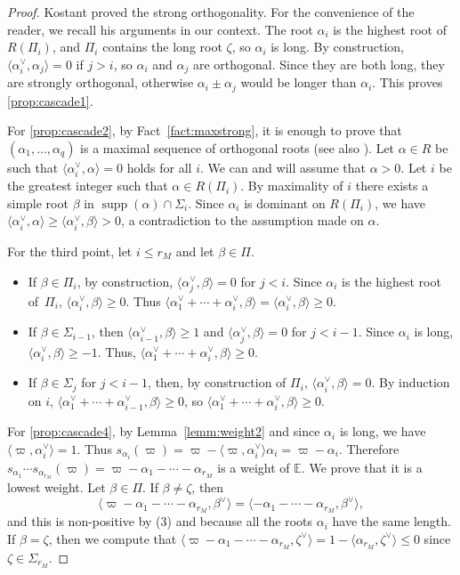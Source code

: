 \documentclass[JEP,XML,SOM,Unicode,NoFloatCountersInSection]{cedram}
\let\oldvee\vee
\renewcommand{\vee}{{\scriptscriptstyle\oldvee}}
\newcommand{\citestar}[3]{\cite[#3]{#1}}
\theoremstyle{plain}
\theoremstyle{definition}
\DeclareMathOperator{\supp}{supp}
\newcommand{\bE}{\mathbb{E}}
\newcommand{\suma}[1]{\alpha_1^\vee + \cdots + \alpha_{#1}^\vee}
\newcommand{\av}{\alpha^\vee}
\newcommand{\rkm}{{r_M}}
\newcommand{\scal}[1]{\langle #1 \rangle}
\begin{document}
\begin{proof}
Kostant \citestar{kostant}*{Lem.\,1.6} proved the strong orthogonality. For the convenience of the reader, we
recall his arguments in our context.
The root $\alpha_i$ is the highest root of $R(\Pi_i)$, and $\Pi_i$ contains the long root $\zeta$,
so $\alpha_i$
is long. By construction, $\scal{\alpha_i^\vee,\alpha_j}=0$ if $j>i$, so $\alpha_i$ and $\alpha_j$ are
orthogonal. Since they are both long, they are strongly orthogonal, otherwise $\alpha_i\pm\alpha_j$ would
be longer than $\alpha_i$. This proves \eqref{prop:cascade1}.

For \eqref{prop:cascade2}, by Fact~\ref{fact:maxstrong}, it is enough to prove that $(\alpha_1,\ldots,\alpha_q)$ is a
maximal sequence of orthogonal roots (see also \citestar{kostant}*{Th.\,1.8}). Let
$\alpha \in R$ be such that $\scal{\alpha_i^\vee,\alpha}=0$ holds for all $i$. We can and will assume that
$\alpha >0$. Let $i$ be the greatest integer such that $\alpha \in R(\Pi_i)$. By maximality of $i$
there exists
a simple root $\beta$ in $\supp(\alpha) \cap \Sigma_i$. Since $\alpha_i$ is dominant on
$R(\Pi_i)$, we have
$\scal{\alpha_i^\vee,\alpha} \geq \scal{\alpha_i^\vee,\beta} > 0$, a contradiction to the assumption made on
$\alpha$.

For the third point, let $i \leq \rkm$ and let $\beta \in \Pi$.
\begin{itemize}
\item If $\beta \in \Pi_i$, by construction, $\scal{\alpha_j^\vee,\beta}=0$ for $j<i$. Since
$\alpha_i$ is the
highest root of~$\Pi_i$, $\scal{\alpha_i^\vee,\beta} \geq 0$. Thus
$\scal{\suma{i},\beta} = \scal{\av_i,\beta} \geq 0$.

\item If $\beta \in \Sigma_{i-1}$, then $\scal{\av_{i-1},\beta} \geq 1$ and $\scal{\av_j,\beta}=0$
for $j<i-1$.
Since $\alpha_i$ is long, $\scal{\av_i,\beta} \geq -1$. Thus, $\scal{\suma{i},\beta} \geq 0$.
\item If $\beta \in \Sigma_j$ for $j<i-1$, then, by construction of $\Pi_i$,
$\scal{\av_i,\beta}=0$. By induction on $i$,
$\scal{\suma{i-1},\beta} \geq 0$, so $\scal{\suma{i},\beta} \geq 0$.
\end{itemize}

For \eqref{prop:cascade4}, by Lemma~\ref{lemm:weight2} and since
$\alpha_i$ is long, we have $\scal{\varpi,\alpha_i^\vee}=1$. Thus $s_{\alpha_i}(\varpi)=\varpi -
\scal{\varpi,\alpha_i^\vee}\alpha_i = \varpi-\alpha_i$.
Therefore
$s_{\alpha_1} \cdots s_{\alpha_\rkm}(\varpi)=\varpi-\alpha_1 - \cdots - \alpha_\rkm$ is a weight of $\bE$.
We prove that it is a lowest weight. Let $\beta \in \Pi$. If $\beta \neq \zeta$, then
$$\scal{\varpi-\alpha_1 - \cdots - \alpha_\rkm,\beta^\vee} = \scal{-\alpha_1 - \cdots -
\alpha_\rkm,\beta^\vee},$$ and
this is non-positive by (3) and because all the roots $\alpha_i$ have the same length. If $\beta=\zeta$, then
we compute that $\scal{\varpi-\alpha_1 - \cdots - \alpha_\rkm,\zeta^\vee} = 1 -
\scal{\alpha_\rkm,\zeta^\vee} \leq 0$
since $\zeta \in \Sigma_\rkm$.
\end{proof}
\end{document}
